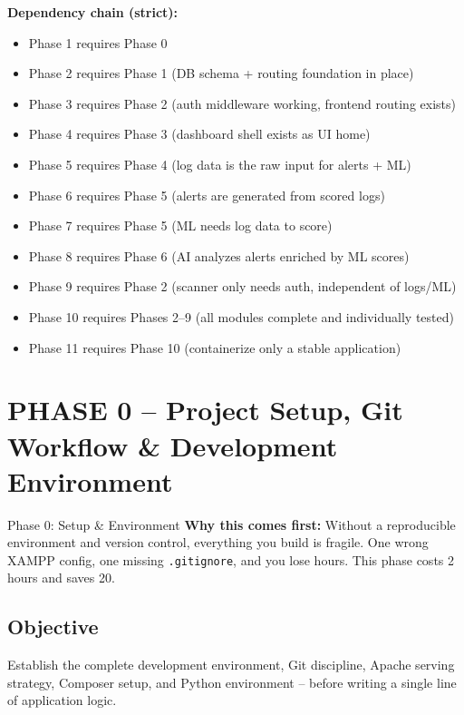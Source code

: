 \documentclass[11pt,a4paper]{report}
\newcommand{\filepath}[1]{\texttt{\small#1}}
\begin{document}
\textbf{Dependency chain (strict):}

\begin{itemize}
    \item Phase 1 requires Phase 0
    \item Phase 2 requires Phase 1 (DB schema + routing foundation in place)
    \item Phase 3 requires Phase 2 (auth middleware working, frontend routing exists)
    \item Phase 4 requires Phase 3 (dashboard shell exists as UI home)
    \item Phase 5 requires Phase 4 (log data is the raw input for alerts + ML)
    \item Phase 6 requires Phase 5 (alerts are generated from scored logs)
    \item Phase 7 requires Phase 5 (ML needs log data to score)
    \item Phase 8 requires Phase 6 (AI analyzes alerts enriched by ML scores)
    \item Phase 9 requires Phase 2 (scanner only needs auth, independent of logs/ML)
    \item Phase 10 requires Phases 2--9 (all modules complete and individually tested)
    \item Phase 11 requires Phase 10 (containerize only a stable application)
\end{itemize}

\chapter{PHASE 0 -- Project Setup, Git Workflow \& Development Environment}

\begin{phasebox}{Phase 0: Setup \& Environment}
\textbf{Why this comes first:} Without a reproducible environment and version control, everything you build is fragile. One wrong XAMPP config, one missing \filepath{.gitignore}, and you lose hours. This phase costs 2 hours and saves 20.
\end{phasebox}

\section*{Objective}
Establish the complete development environment, Git discipline, Apache serving strategy, Composer setup, and Python environment -- before writing a single line of application logic.
\end{document}
